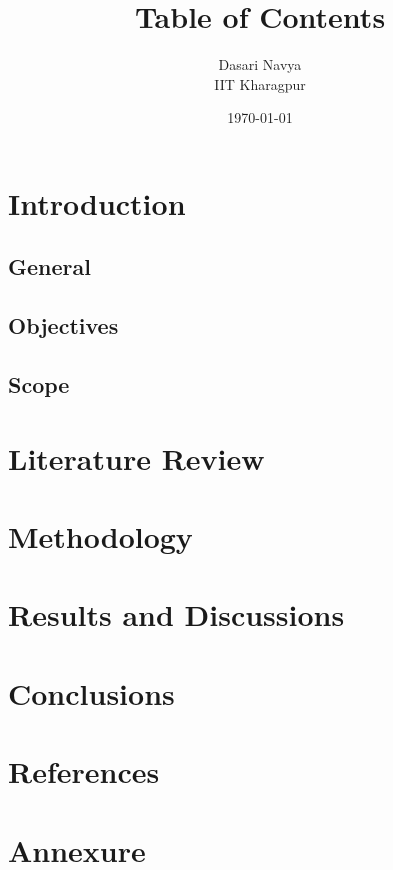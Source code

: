 \documentclass{report}
\title{Table of Contents}
\author{Dasari Navya \\ IIT Kharagpur}
\date{\today}
\begin{document}
	\maketitle
	\tableofcontents
	
	\chapter{Introduction}
	
		\section{General}
	
		\section{Objectives}
	
		\section{Scope}
	
	\chapter{Literature Review}
	
	\chapter{Methodology}
	
	\chapter{Results and Discussions}
	
	\chapter{Conclusions}
	
	\chapter{References}
	
	\chapter{Annexure}
\end{document}
